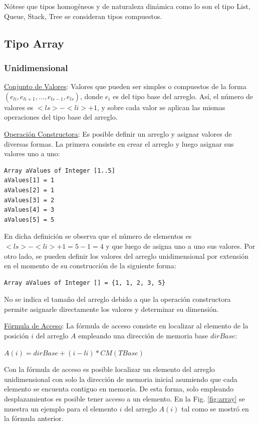 Nótese que tipos homogéneos y de naturaleza dinámica como lo son el tipo List, Queue, Stack, Tree se consideran tipos compuestos.

\subsection{Tipo Array}

\subsubsection{Unidimensional}

\underline{Conjunto de Valores}: Valores que pueden ser simples o compuestos de la forma $(e_{li}, e_{li+1}, ..., e_{ls-1}, e_{ls})$, donde $e_i$ es del tipo base del arreglo. Así, el número de valores es $<ls> - <li> + 1$, y sobre cada valor se aplican las mismas operaciones del tipo base del arreglo.

\underline{Operación Constructora}: Es posible definir un arreglo y asignar valores de diversas formas. La primera consiste en crear el arreglo y luego asignar sus valores uno a uno:

\begin{lstlisting}[upquote=true, language=pseudo]
Array aValues of Integer [1..5]
aValues[1] = 1
aValues[2] = 1
aValues[3] = 2
aValues[4] = 3
aValues[5] = 5
\end{lstlisting}

En dicha definición se observa que el número de elementos es $<ls> - <li> + 1 = 5 - 1 = 4$ y que luego de asigna uno a uno sus valores. Por otro lado, se pueden definir los valores del arreglo unidimensional por extensión en el momento de su construcción de la siguiente forma:

\begin{lstlisting}[upquote=true, language=pseudo]
Array aValues of Integer [] = {1, 1, 2, 3, 5}
\end{lstlisting}

No se indica el tamaño del arreglo debido a que la operación constructora permite asignarle directamente los valores y determinar su dimensión.

\underline{Fórmula de Acceso}: La fórmula de acceso consiste en localizar al elemento de la posición $i$ del arreglo $A$ empleando una dirección de memoria base $dirBase$:

$A(i) = dirBase + (i - li) * CM(TBase)$

Con la fórmula de acceso es posible localizar un elemento del arreglo unidimensional con solo la dirección de memoria inicial asumiendo que cada elemento se encuenta contiguo en memoria. De esta forma, solo empleando desplazamientos es posible tener acceso a un elemento. En la Fig. \ref{fig:array} se muestra un ejemplo para el elemento $i$ del arreglo $A(i)$ tal como se mostró en la fórmula anterior.

